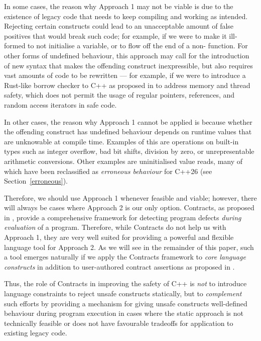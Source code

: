 In some cases, the reason why Approach 1 may not be viable is due to the existence of legacy code that needs to keep compiling and working as intended. Rejecting certain constructs could lead to an unacceptable amount of false positives that would break such code; for example, if we were to make it ill-formed to not initialise a variable, or to flow off the end of a non- function. For other forms of undefined behaviour, this approach may call for the introduction of new syntax that makes the offending construct inexpressible, but also requires vast amounts of code to be rewritten --- for example, if we were to introduce a Rust-like borrow checker to C++ as proposed in \cite{P3390R0} to address memory and thread safety, which does not permit the usage of regular pointers, references, and random access iterators in safe code.

In other cases, the reason why Approach 1 cannot be applied is because whether the offending construct has undefined behaviour depends on runtime values that are unknowable at compile time. Examples of this are operations on built-in types such as integer overflow, bad bit shifts, division by zero, or unrepresentable arithmetic conversions. Other examples are uninitialised value reads, many of which have been reclassified as \emph{erroneous behaviour} for C++26 (see Section~\ref{erroneous}).

Therefore, we should use Approach 1 whenever feasible and viable; however, there will always be cases where Approach 2 is our only option. Contracts, as proposed in \cite{P2900R9}, provide a comprehensive framework for detecting program defects \emph{during evaluation} of a program. Therefore, while Contracts do not help us with Approach 1, they are very well suited for providing a powerful and flexible language tool for Approach 2. As we will see in the remainder of this paper, such a tool emerges naturally if we apply the Contracts framework to \emph{core language constructs} in addition to user-authored contract assertions as proposed in \cite{P2900R9}.

Thus, the role of Contracts in improving the safety of C++ is \emph{not} to introduce language constraints to reject unsafe constructs statically, but to \emph{complement} such efforts by providing a mechanism for giving unsafe constructs well-defined behaviour during program execution in cases where the static approach is not technically feasible or does not have favourable tradeoffs for application to existing legacy code.

